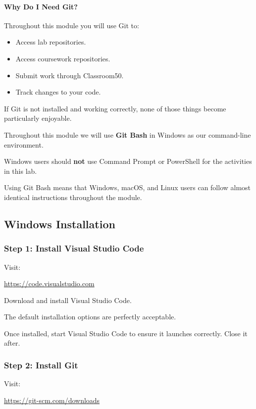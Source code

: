 \documentclass{csc2059practical}
\begin{document}
\paragraph{Why Do I Need Git?}
Throughout this module you will use Git to:

\begin{itemize}
  \item Access lab repositories.
  \item Access coursework repositories.
  \item Submit work through Classroom50.
  \item Track changes to your code.
\end{itemize}
If Git is not installed and working correctly, none of those things become particularly enjoyable.

\begin{importantnote}

Throughout this module we will use \textbf{Git Bash} in Windows as our command-line environment.


Windows users should \textbf{not} use Command Prompt or PowerShell for the activities in this lab.


Using Git Bash means that Windows, macOS, and Linux users can follow almost identical instructions throughout the module.


\end{importantnote}
\subsection{Windows Installation}
\subsubsection{Step 1: Install Visual Studio Code}
Visit:

\href{https://code.visualstudio.com}{https://code.visualstudio.com}

Download and install Visual Studio Code.

The default installation options are perfectly acceptable.

Once installed, start Visual Studio Code to ensure it launches correctly. Close it after.

\subsubsection{Step 2: Install Git}
Visit:

\href{https://git-scm.com/downloads}{https://git-scm.com/downloads}
\end{document}
